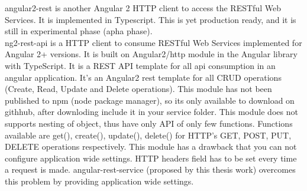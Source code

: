 \hspace{0.2in} angular2-rest\cite{angular2-rest} is another Angular 2 HTTP client to access the RESTful Web Services. It is implemented in Typescript. This is yet production ready, and it is still in experimental phase (apha phase).\\

\hspace{0.2in} ng2-rest-api\cite{ng2-rest-api} is a HTTP client to consume RESTful Web Services implemented for Angular 2+ versions. It is built on Angular2/http module in the Angular library with TypeScript. It is a  REST API template for all api consumption in an angular application. It's an Angular2 rest template for all CRUD operations (Create, Read, Update and Delete operations). This module has not been published to npm (node package manager), so its only available to  download on githhub, after downloding include it in your service folder. This module does not supports nesting of object, thus have only API of only few functions. Functions available are get(), create(), update(), delete() for HTTP's GET, POST, PUT, DELETE operations respectively. This module has a drawback that you can not configure application wide settings. HTTP headers field has to be set every time a request is made. angular-rest-service (proposed by this thesis work) overcomes this problem by providing application wide settings.